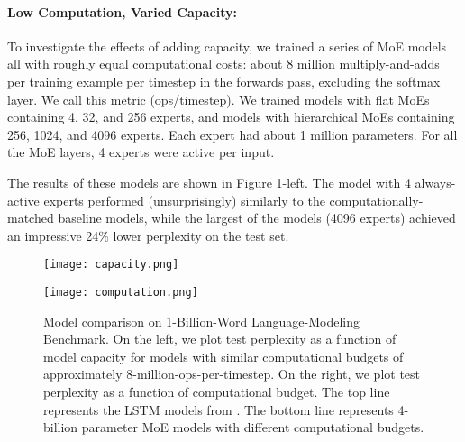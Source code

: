 \documentclass{article} \pdfoutput=1
\begin{document}
\paragraph{Low Computation, Varied Capacity:} To investigate the effects of adding capacity, we trained a series of MoE models all with roughly equal computational costs: about 8 million multiply-and-adds per training example per timestep in the forwards pass, excluding the softmax layer.  We call this metric (ops/timestep).  We trained models with flat MoEs containing 4, 32, and 256 experts, and models with hierarchical MoEs containing 256, 1024, and 4096 experts.  Each expert had about 1 million parameters.  For all the MoE layers, 4 experts were active per input.

The results of these models are shown in Figure \ref{fig:lm1b}-left.   The model with 4 always-active experts performed (unsurprisingly) similarly to the computationally-matched baseline models, while the largest of the models (4096 experts) achieved an impressive 24\% lower perplexity on the test set.



\begin{figure}[h!]
\centering
\begin{minipage}{.49\textwidth}
  \centering
  \texttt{[image: capacity.png]}
\end{minipage}
\begin{minipage}{.49\textwidth}
  \centering
  \texttt{[image: computation.png]}
\end{minipage}
\caption{Model comparison on 1-Billion-Word Language-Modeling Benchmark.  On the left, we plot test perplexity as a function of model capacity for models with similar computational budgets of approximately 8-million-ops-per-timestep.  On the right, we plot test perplexity as a function of computational budget.  The top line represents the LSTM models from \citep{RafalNoam16}.  The bottom line represents 4-billion parameter MoE models with different computational budgets.}
\label{fig:lm1b}
\end{figure}
\end{document}
